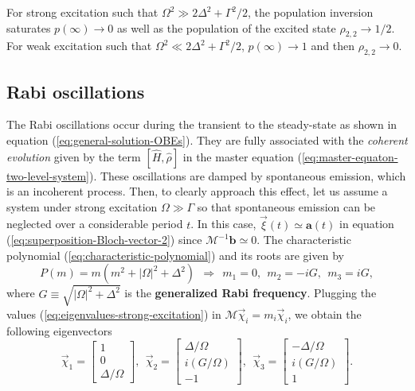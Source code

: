 For strong excitation such that $ \Omega^2 \gg 2\Delta^2 + \Gamma^2 / 2 $, the population inversion saturates $ p(\infty) \rightarrow 0 $ as well as the population of the excited state $ \rho_{2,2} \rightarrow 1/2 $. For weak excitation such that $ \Omega^2 \ll 2\Delta^2 + \Gamma^2 / 2$, $ p(\infty) \rightarrow 1 $ and then $ \rho_{2,2} \rightarrow 0 $.

\subsection{Rabi oscillations}
\label{sec:Rabi-oscillations}

The Rabi oscillations occur during the transient to the steady-state as shown in equation (\ref{eq:general-solution-OBEs}). They are fully associated with the \textit{coherent evolution} given by the term $ [\hat{H}, \hat{\rho}] $ in the master equation (\ref{eq:master-equaton-two-level-system}). These oscillations are damped by spontaneous emission, which is an incoherent process. Then, to clearly approach this effect, let us assume a system under strong excitation $ \Omega \gg \Gamma $ so that spontaneous emission can be neglected over a considerable period $ t $. In this case, $\vec{\xi}(t) \simeq \mathbf{a}(t) $ in equation (\ref{eq:superposition-Bloch-vector-2}) since $ \mathcal{M}^{-1} \mathbf{b} \simeq 0 $. The characteristic polynomial (\ref{eq:characteristic-polynomial}) and its roots are given by
\begin{equation}
	P(m) = m (m^2 + |\Omega|^2 + \Delta^2)\ \ \Rightarrow\ \
	m_1 = 0,\ \ m_2 = -iG,\ \ m_3 = iG,
	\label{eq:eigenvalues-strong-excitation}
\end{equation}
where $ G \equiv \sqrt{|\Omega|^2 + \Delta^2} $ is the \textbf{generalized Rabi frequency}. Plugging the values (\ref{eq:eigenvalues-strong-excitation}) in $ \mathcal{M}\vec{\chi}_i = m_i \vec{\chi}_i $, we obtain the following eigenvectors
\begin{equation}
	\vec{\chi}_1 = \left[ \begin{matrix} 1 \\ 0 \\ \Delta / \Omega \end{matrix} \right],\ \ \vec{\chi}_2 =  \left[ \begin{matrix} \Delta / \Omega \\ i(G / \Omega) \\ -1 \end{matrix} \right],\ \ \vec{\chi}_3 =  \left[ \begin{matrix} -\Delta / \Omega \\ i(G / \Omega) \\ 1 \end{matrix} \right].
	\label{eq:eigenvectors-strong-excitation}
\end{equation}
